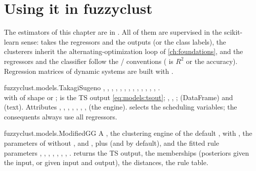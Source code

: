 \section{Using it in fuzzyclust}\label{sec:models:api}

The estimators of this chapter are in . All of them are supervised in the scikit-learn sense:  takes the regressors and the outputs (or the class labels), the clusterers inherit the alternating-optimization loop of \cref{ch:foundations}, and the regressors and the classifier follow the  /  conventions ( is $R^2$ or the accuracy). Regression matrices of dynamic systems are built with .

\begin{apibox}{fuzzyclust.models.TakagiSugeno}
, , , , , , , , , , , , , .\\
 with  of shape  or ;  is the TS output \eqref{eq:models:tsout}; , , ;  (DataFrame) and  (text). Attributes , , ,  , , , ,  (the engine).  selects the scheduling variables; the consequents always use all regressors.
\end{apibox}

\begin{apibox}{fuzzyclust.models.ModifiedGG}
A , the clustering engine of the default , with , the parameters of  without ,  and , plus  (and  by default), and the fitted rule parameters , , , , , , , .  returns the TS output,  the memberships (posteriors given the input, or given input and output),  the distances,  the rule table.
\end{apibox}

